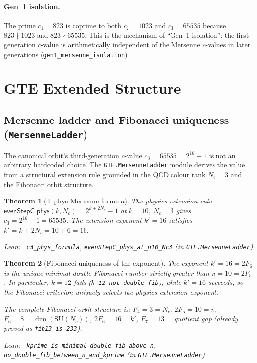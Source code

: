 \documentclass[11pt,a4paper]{article}
\newenvironment{leanref}%
  {\par\smallskip\noindent\begingroup\raggedright\textup{Lean:}~}%
  {\par\endgroup}
\newtheorem{theorem}{Theorem}[section]
\theoremstyle{definition}
\begin{document}
\paragraph{Gen~1 isolation.}
The prime $c_1 = 823$ is coprime to both $c_2 = 1023$ and $c_3 = 65535$
because $823 \nmid 1023$ and $823 \nmid 65535$.  This is the mechanism
of ``Gen~1 isolation'': the first-generation $c$-value is
arithmetically independent of the Mersenne $c$-values in later
generations (\texttt{gen1\_mersenne\_isolation}).

\section{GTE Extended Structure}\label{sec:gte-extended}

\subsection{Mersenne ladder and Fibonacci uniqueness (\texttt{MersenneLadder})}\label{subsec:mersenne-ladder}

The canonical orbit's third-generation $c$-value $c_3 = 65535 = 2^{16} - 1$ is
not an arbitrary hardcoded choice.  The \texttt{GTE.MersenneLadder} module
derives the value from a structural extension rule grounded in the QCD colour rank
$N_c = 3$ and the Fibonacci orbit structure.

\begin{theorem}[T-phys Mersenne formula]\label{thm:c3-phys}
The physics extension rule $\mathsf{evenStepC\_phys}(k, N_c) = 2^{k + 2N_c} - 1$
at $k = 10$, $N_c = 3$ gives $c_3 = 2^{16} - 1 = 65535$.  The extension
exponent $k' = 16$ satisfies $k' = k + 2N_c = 10 + 6 = 16$.

\begin{leanref} \lstinline|c3_phys_formula|,
\lstinline|evenStepC_phys_at_n10_Nc3|
\textup{(in \texttt{GTE.MersenneLadder})}
\end{leanref}
\end{theorem}

\begin{theorem}[Fibonacci uniqueness of the exponent]\label{thm:fib-unique}
The exponent $k' = 16 = 2F_6$ is the unique minimal double Fibonacci number
strictly greater than $n = 10 = 2F_5$.  In particular, $k = 12$ fails
(\lstinline|k_12_not_double_fib|), while $k' = 16$ succeeds, so the
Fibonacci criterion uniquely selects the physics extension exponent.

The complete Fibonacci orbit structure is:
$F_4 = 3 = N_c$, $2F_5 = 10 = n$, $F_6 = 8 = \dim(\mathrm{SU}(N_c))$,
$2F_6 = 16 = k'$, $F_7 = 13$ = quotient gap (already proved as \lstinline|fib13_is_233|).

\begin{leanref} \lstinline|kprime_is_minimal_double_fib_above_n|,
\lstinline|no_double_fib_between_n_and_kprime|
\textup{(in \texttt{GTE.MersenneLadder})}
\end{leanref}
\end{theorem}
\end{document}
